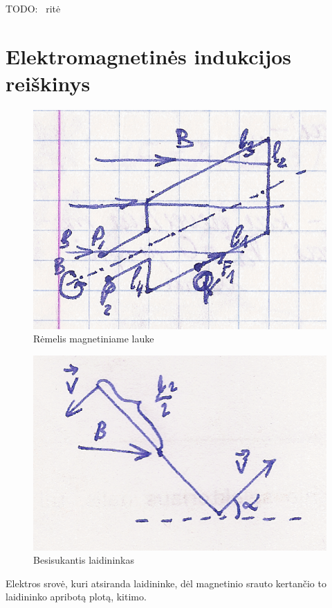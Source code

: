 \begin{defn}[Solenoidas]
  TODO: ~ritė
\end{defn}

\section{Elektromagnetinės indukcijos reiškinys}

\begin{figure}[H]
  \begin{center}
    \includegraphics[height=0.5\textwidth]{images/remelis.png}
  \end{center}
  \caption{Rėmelis magnetiniame lauke}
  \label{fig:remelis}
\end{figure}

\begin{figure}[H]
  \begin{center}
    \includegraphics[height=0.5\textwidth]{images/besisukantis_laidininkas.png}
  \end{center}
  \caption{Besisukantis laidininkas}
  \label{fig:besisukantis_laidininkas}
\end{figure}

\begin{defn}
  Elektros srovė, kuri atsiranda laidininke, dėl magnetinio srauto
  kertančio to laidininko apribotą plotą, kitimo.
\end{defn}


